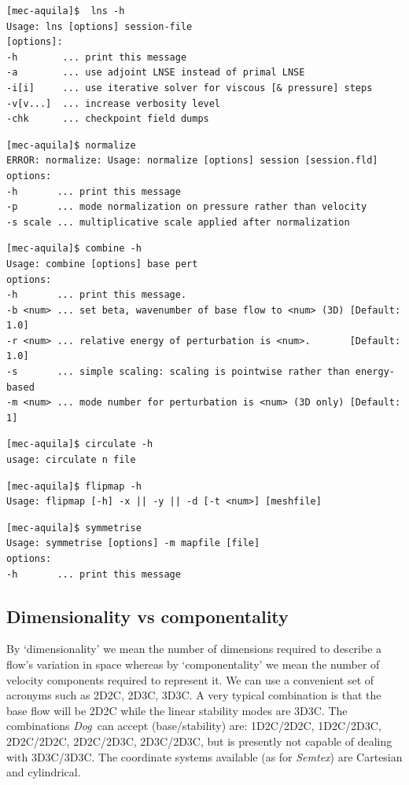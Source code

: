\documentclass[11pt,a4paper]{report}
\newcommand{\Semtex}{\emph{Semtex}}
\newcommand{\Dog}{\emph{Dog}}
\begin{document}
{\small
\begin{verbatim}
[mec-aquila]$  lns -h
Usage: lns [options] session-file
[options]:
-h        ... print this message
-a        ... use adjoint LNSE instead of primal LNSE
-i[i]     ... use iterative solver for viscous [& pressure] steps
-v[v...]  ... increase verbosity level
-chk      ... checkpoint field dumps
\end{verbatim}
}

{\small
\begin{verbatim}
[mec-aquila]$ normalize
ERROR: normalize: Usage: normalize [options] session [session.fld]
options:
-h       ... print this message
-p       ... mode normalization on pressure rather than velocity
-s scale ... multiplicative scale applied after normalization
\end{verbatim}
}

{\small
\begin{verbatim}
[mec-aquila]$ combine -h
Usage: combine [options] base pert
options:
-h       ... print this message.
-b <num> ... set beta, wavenumber of base flow to <num> (3D) [Default: 1.0]
-r <num> ... relative energy of perturbation is <num>.       [Default: 1.0]
-s       ... simple scaling: scaling is pointwise rather than energy-based
-m <num> ... mode number for perturbation is <num> (3D only) [Default: 1]
\end{verbatim}
}

{\small
\begin{verbatim}
[mec-aquila]$ circulate -h
usage: circulate n file
\end{verbatim}
}

{\small
\begin{verbatim}
[mec-aquila]$ flipmap -h
Usage: flipmap [-h] -x || -y || -d [-t <num>] [meshfile]
\end{verbatim}
}

{\small
\begin{verbatim}
[mec-aquila]$ symmetrise
Usage: symmetrise [options] -m mapfile [file]
options:
-h       ... print this message
\end{verbatim}
}

\subsection{Dimensionality vs componentality}

By `dimensionality' we mean the number of dimensions required to
describe a flow's variation in space whereas by `componentality' we
mean the number of velocity components required to represent it.  We
can use a convenient set of acronyms such as 2D2C, 2D3C, 3D3C.  A very
typical combination is that the base flow will be 2D2C while the
linear stability modes are 3D3C.  The combinations \Dog\ can accept
(base/stability) are: 1D2C/2D2C, 1D2C/2D3C, 2D2C/2D2C, 2D2C/2D3C,
2D3C/2D3C, but is presently not capable of dealing with 3D3C/3D3C.
The coordinate systems available (as for \Semtex) are Cartesian and
cylindrical.  \citep[One might anticipate that 1D2C/2D3C analyses are
  not very useful owing to Squire's theorem for stability of `parallel
  shear flows', see e.g.][but Squire's theorem does not hold in
  cylindrical coordinates.]{schmid01}
\end{document}
